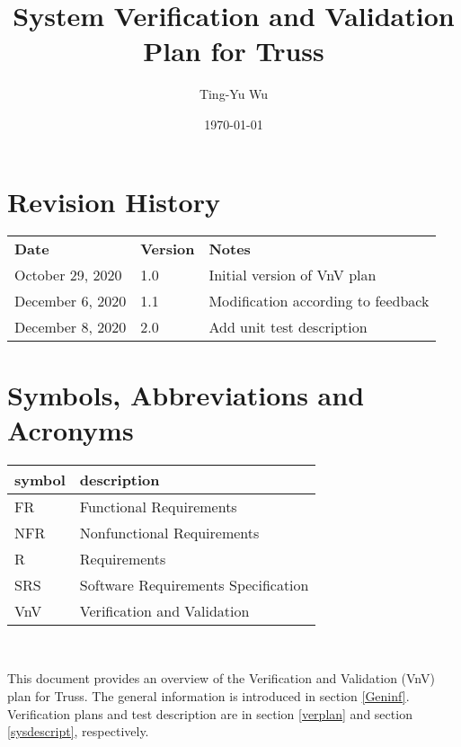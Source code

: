\documentclass[12pt, titlepage]{article}
\begin{document}
\title{System Verification and Validation Plan for Truss} 
\author{Ting-Yu Wu}
\date{\today}
	
\maketitle


\section{Revision History}

\begin{tabularx}{\textwidth}{p{3.5cm}p{2cm}X}
\toprule {\bf Date} & {\bf Version} & {\bf Notes}\\
October 29, 2020 & 1.0 & Initial version of VnV plan\\
December 6, 2020 & 1.1 & Modification according to feedback\\
December 8, 2020 & 2.0 & Add unit test description\\
\bottomrule
\end{tabularx}

\newpage

\tableofcontents

\listoftables

\newpage

\section{Symbols, Abbreviations and Acronyms}

\renewcommand{\arraystretch}{1.2}
\begin{tabular}{l l} 
  \toprule		
  \textbf{symbol} & \textbf{description}\\
  \midrule 
  FR & Functional Requirements\\
  NFR & Nonfunctional Requirements\\
  R & Requirements\\
  SRS & Software Requirements Specification\\
  VnV & Verification and Validation\\
  \bottomrule
\end{tabular}\\


\newpage


This document provides an overview of the Verification and Validation (VnV) 
plan for Truss. The general information is introduced in section \ref{Geninf}. 
Verification plans and test description are in section \ref{verplan} and 
section \ref{sysdescript}, respectively.
\end{document}
